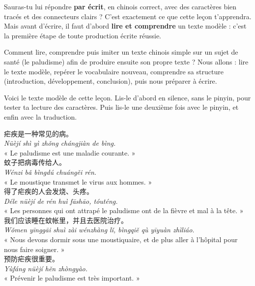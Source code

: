 \documentclass[11pt]{article}
\newcounter{popsec}
\newcounter{popsub}
\newcommand{\courssub}[1]{%
  \stepcounter{popsub}%
  \par\vspace{9pt}\noindent{\popxbold\fontsize{11.5}{13}\selectfont\color{popink}{\color{poporange}\thepopsec.\thepopsub}\hspace{6pt}#1}\par\nopagebreak\vspace{4pt}
}
\begin{document}
Sauras-tu lui répondre \textbf{par écrit}, en chinois correct, avec des caractères bien tracés et des connecteurs clairs ? C'est exactement ce que cette leçon t'apprendra. Mais avant d'écrire, il faut d'abord \textbf{lire et comprendre} un texte modèle : c'est la première étape de toute production écrite réussie.

\begin{aretenir}
Comment lire, comprendre puis imiter un texte chinois simple sur un sujet de santé (le paludisme) afin de produire ensuite son propre texte ? Nous allons : lire le texte modèle, repérer le vocabulaire nouveau, comprendre sa structure (introduction, développement, conclusion), puis nous préparer à écrire.
\end{aretenir}

\courssub{Lecture du texte modèle}

Voici le texte modèle de cette leçon. Lis-le d'abord en silence, sans le pinyin, pour tester ta lecture des caractères. Puis lis-le une deuxième fois avec le pinyin, et enfin avec la traduction.

\begin{textebox}
疟疾是一种常见的病。\\
\emph{Nüèjí shì yì zhǒng chángjiàn de bìng.}\\
« Le paludisme est une maladie courante. »\\[0.4em]
蚊子把病毒传给人。\\
\emph{Wénzi bǎ bìngdú chuángěi rén.}\\
« Le moustique transmet le virus aux hommes. »\\[0.4em]
得了疟疾的人会发烧、头疼。\\
\emph{Déle nüèjí de rén huì fāshāo, tóuténg.}\\
« Les personnes qui ont attrapé le paludisme ont de la fièvre et mal à la tête. »\\[0.4em]
我们应该睡在蚊帐里，并且去医院治疗。\\
\emph{Wǒmen yīnggāi shuì zài wénzhàng lǐ, bìngqiě qù yīyuàn zhìliáo.}\\
« Nous devons dormir sous une moustiquaire, et de plus aller à l'hôpital pour nous faire soigner. »\\[0.4em]
预防疟疾很重要。\\
\emph{Yùfáng nüèjí hěn zhòngyào.}\\
« Prévenir le paludisme est très important. »
\end{textebox}
\end{document}
